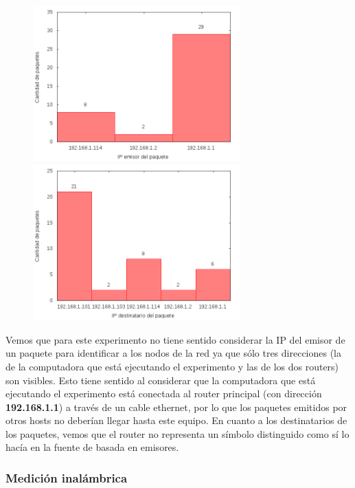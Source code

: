 \begin{figure}[!h]
\centering
\begin{minipage}{8cm}
  \centering
  \includegraphics[width=8cm]{../mediciones/home-eth-10/home-eth-10IpsSrcArp.png}
\end{minipage}%
\begin{minipage}{8cm}
  \centering
  \includegraphics[width=8cm]{../mediciones/home-eth-10/home-eth-10IpsDstArp.png}
\end{minipage}
\end{figure}

Vemos que para este experimento no tiene sentido considerar la IP del emisor de un paquete para identificar a los nodos de la red ya que sólo tres direcciones
(la de la computadora que está ejecutando el experimento y las de los dos routers) son visibles. Esto tiene sentido al considerar que la computadora que
está ejecutando el experimento está conectada al router principal (con dirección \textbf{192.168.1.1}) a través de un cable ethernet, por lo que los paquetes emitidos
por otros hosts no deberían llegar hasta este equipo. En cuanto a los destinatarios de los paquetes, vemos que el router no representa un símbolo distinguido
como sí lo hacía en la fuente de basada en emisores.

\subsubsection{Medición inalámbrica}

